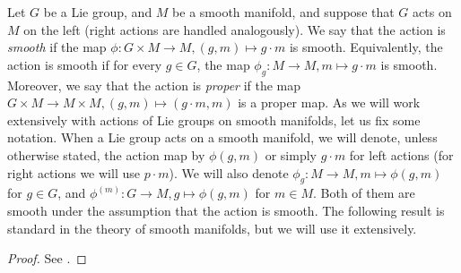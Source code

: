 Let \(G\) be a Lie group, and \(M\) be a smooth manifold, and suppose that \(G\) acts on \(M\) on the left (right actions are handled analogously). We say that the action is \textit{smooth} if the map \(\phi\colon G \times M \to M, (g,m) \mapsto g \cdot m\) is smooth. Equivalently, the action is smooth if for every \(g \in G\), the map \(\phi_g\colon M \to M, m \mapsto g \cdot m\) is smooth. Moreover, we say that the action is \textit{proper} if the map \(G \times M \to M \times M, (g,m)\mapsto (g\cdot m, m)\) is a proper map. As we will work extensively with actions of Lie groups on smooth manifolds, let us fix some notation. When a Lie group acts on a smooth manifold, we will denote, unless otherwise stated, the action map by \(\phi(g,m)\) or simply \(g \cdot m\) for left actions (for right actions we will use \(p \cdot m\)). We will also denote \(\phi_g\colon M \to M, m \mapsto \phi(g,m)\) for \(g \in G\), and \(\phi^{(m)}\colon G \to M, g \mapsto \phi(g,m)\) for \(m \in M\). Both of them are smooth under the assumption that the action is smooth. The following result is standard in the theory of smooth manifolds, but we will use it extensively.

\begin{proof}
    See \parencite[Th. 21.10]{lee_introSM}.
\end{proof}

